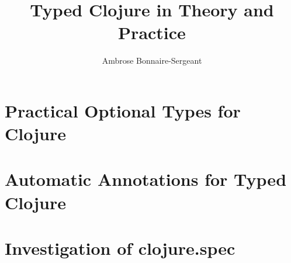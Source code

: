 \documentclass[11pt]{iuthesis}
\newcommand{\thesisauthor}[0]{Ambrose Bonnaire-Sergeant}
\newcommand{\thesistitle}[0]{Typed Clojure in Theory and Practice}
\begin{document}
\frontmatter %
\title{\thesistitle{}}
\author{\thesisauthor{}}



\begin{abstract}

\end{abstract}

\maketitle
\signaturepage
\copyrightpage
\makeabstract

\singlespacing
\tableofcontents

\listoffigures

\listoftheorems
\doublespacing

\newpage

\mainmatter



\part{Practical Optional Types for Clojure}
\label{part:types}









\part{Automatic Annotations for Typed Clojure}
\label{part:autoann}














\part{Investigation of clojure.spec}
\label{part:spec}
\end{document}
